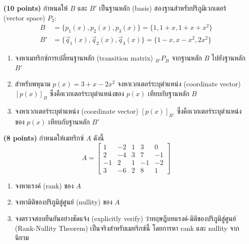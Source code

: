 ﻿\documentclass[12pt, a4paper]{exam}
\begin{document}
\begin{questions}
\question \textbf{(10 points)} กำหนดให้ $B$ และ $B'$ เป็นฐานหลัก (basis) สองฐานสำหรับปริภูมิเวกเตอร์ (vector space) $P_2$:
\[
\begin{aligned}
B &= \{p_1(x), p_2(x), p_3(x)\} = \{1, 1+x, 1+x+x^2\} \\
B' &= \{\vec{q}_1(x), \vec{q}_2(x), \vec{q}_3(x)\} = \{1-x, x-x^2, 2x^2\}
\end{aligned}
\]
\begin{enumerate}[label=(\alph*)]
    \item จงหาเมทริกซ์การเปลี่ยนฐานหลัก (transition matrix) $_{B'}P_{B}$ จากฐานหลัก $B$ ไปยังฐานหลัก $B'$
    \item สำหรับพหุนาม $p(x) = 3 + x - 2x^2$ จงหาเวกเตอร์ระบุตำแหน่ง (coordinate vector) $[p(x)]_B$ ซึ่งคือเวกเตอร์ระบุตำแหน่งของ $p(x)$ เทียบกับฐานหลัก $B$
    \item จงหาเวกเตอร์ระบุตำแหน่ง (coordinate vector) $[p(x)]_{B'}$ ซึ่งคือเวกเตอร์ระบุตำแหน่งของ $p(x)$ เทียบกับฐานหลัก $B'$
\end{enumerate}
\newpage

\question \textbf{(8 points)} กำหนดให้เมทริกซ์ $A$ ดังนี้
\[
A = \begin{bmatrix} 1 & -2 & 1 & 3 & 0 \\ 2 & -4 & 3 & 7 & -1 \\ -1 & 2 & 1 & -1 & -2 \\ 3 & -6 & 2 & 8 & 1 \end{bmatrix}
\]
\begin{enumerate}[label=(\alph*)]
    \item จงหาแรงค์ (rank) ของ $A$
    \item จงหามิติของปริภูมิสู่ศูนย์ (nullity) ของ $A$
    \item จงตรวจสอบยืนยันอย่างชัดแจ้ง (explicitly verify) ว่าทฤษฎีบทแรงค์-มิติของปริภูมิสู่ศูนย์ (Rank-Nullity Theorem) เป็นจริงสำหรับเมทริกซ์นี้ โดยการหา rank และ nullity จากนิยาม
\end{enumerate}


\end{questions}
\end{document}
